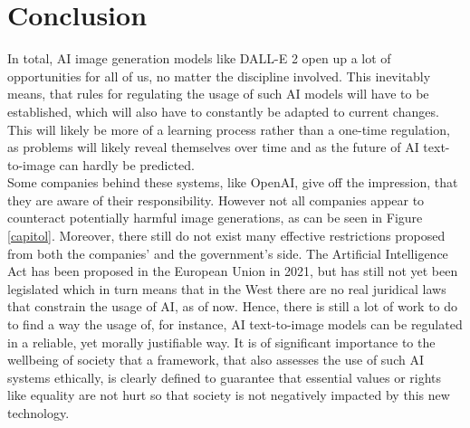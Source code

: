 \documentclass[10pt,twocolumn,twoside]{osajnl}
\begin{document}
\section{Conclusion}
In total, AI image generation models like DALL-E 2 open up a lot of opportunities for all of us, no matter the discipline involved. 
This inevitably means, that rules for regulating the usage of such AI models will have to be established, which will also have to constantly be adapted to current changes.
This will likely be more of a learning process rather than a one-time regulation, as problems will likely reveal themselves over time and as the future of AI text-to-image can 
hardly be predicted.
\\
Some companies behind these systems, like OpenAI, give off the impression, that they are aware of their responsibility. 
However not all companies appear to counteract potentially harmful image generations, as can be seen in Figure \ref{capitol}.  
Moreover, there still do not exist many effective restrictions proposed from both the companies' and the government's side.
The Artificial Intelligence Act has been proposed in the European Union in 2021, but has still not yet been legislated which in turn means that in the West
there are no real juridical laws that constrain the usage of AI, as of now. Hence, there is still a lot of work to do to 
find a way the usage of, for instance, AI text-to-image models can be regulated in a reliable, yet morally justifiable way.
It is of significant importance to the wellbeing of society that a framework, that also assesses the use of such AI systems ethically, is clearly defined
to guarantee that essential values or rights like equality are not hurt so that society is not negatively impacted by this new technology.



\bigskip


%

\end{document}
